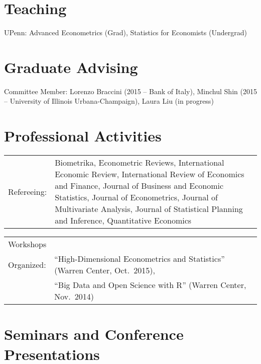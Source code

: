 \documentclass[line,overlapped]{myres}
\begin{document}
\begin{resume}
\section{\sc Teaching }
\vspace{0.5em}
	UPenn: Advanced Econometrics (Grad), Statistics for Economists (Undergrad)
	


\section{\sc Graduate Advising}
\vspace{0.5em}
Committee Member: Lorenzo Braccini (2015 -- Bank of Italy), Minchul Shin (2015 -- University of Illinois Urbana-Champaign), Laura Liu (in progress)


\section{\sc Professional Activities}
\vspace{1em}

\begin{tabular}{p{2cm}p{12cm}}
Refereeing: & Biometrika, 
Econometric Reviews, 
International Economic Review,  
International Review of Economics and Finance,
Journal of Business and Economic Statistics, 
Journal of Econometrics,
Journal of Multivariate Analysis,
Journal of Statistical Planning and Inference, 
Quantitative Economics

\end{tabular}


\begin{tabular}{p{2cm}p{12cm}}
Workshops \\Organized: &``High-Dimensional Econometrics and Statistics'' (Warren Center, Oct.\ 2015),\\
& ``Big Data and Open Science with R'' (Warren Center, Nov.\ 2014)
\end{tabular}


\section{\sc Seminars and Conference Presentations}
\vspace{1em}


\end{resume}
\end{document}
